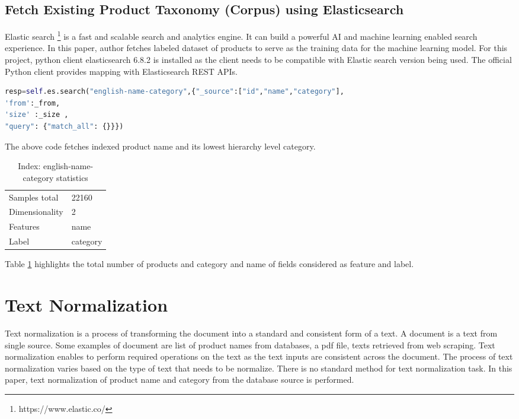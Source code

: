 \subsection {Fetch Existing Product Taxonomy (Corpus) using Elasticsearch}
Elastic search \footnote{https://www.elastic.co/} is a fast and scalable search and analytics engine. It can build a powerful AI and machine learning enabled search experience. In this paper, author fetches labeled dataset of products to serve as the training data for the machine learning model.
For this project, python client elasticsearch 6.8.2 is installed as the client needs to be compatible with Elastic search version being used. The official Python client provides mapping with Elasticsearch REST APIs.

\begin{lstlisting}[language=Python]
resp=self.es.search("english-name-category",{"_source":["id","name","category"],
'from':_from,
'size' :_size ,
"query": {"match_all": {}}})
\end{lstlisting}

The above code fetches indexed product name and its lowest hierarchy level category.  
\begin{table}[h]
      \caption{Index: english-name-category statistics}
      \centering
      \label{table:enc}
\begin{tabular}{ll}
      \toprule 

      Samples total&22160 \\
      Dimensionality&2 \\
      Features&name \\
      Label&category \\
      
      \bottomrule
\end{tabular}
\end{table}

Table \ref{table:enc} highlights the total number of products and category and name of fields considered as feature and label. 

\section{Text Normalization} \label{text_normalization}

Text normalization is a process of transforming the document into a standard and consistent form of a text. A document is a text from single source. Some examples of document are list of product names from databases, a pdf file, texts retrieved from web scraping. Text normalization enables to perform required operations on the text as the text inputs are consistent across the document. The process of text normalization varies based on the type of text that needs to be normalize. There is no standard method for text normalization task. In this paper, text normalization of product name and category from the database source is performed. 

